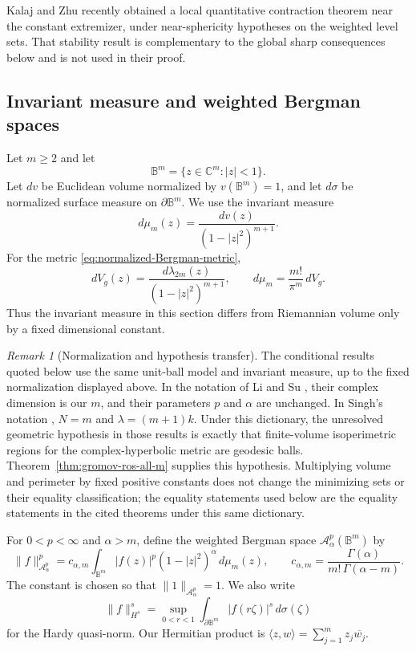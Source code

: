 \documentclass[11pt,reqno]{amsart}
\numberwithin{equation}{section}
\theoremstyle{definition}
\theoremstyle{remark}
\newtheorem{remark}[theorem]{Remark}
\begin{document}
{
Kalaj and Zhu \cite{KalajZhu2026} recently obtained a local quantitative
contraction theorem near the constant extremizer, under near-sphericity
hypotheses on the weighted level sets.  That stability result is
complementary to the global sharp consequences below and is not used in
their proof.
}

\subsection{Invariant measure and weighted Bergman spaces}

Let $m\ge2$ and let
\[
\mathbb B^m=\{z\in\mathbb C^m:|z|<1\}.
\]
Let $dv$ be Euclidean volume normalized by $v(\mathbb B^m)=1$, and let
$d\sigma$ be normalized surface measure on $\partial\mathbb B^m$.  We use
the invariant measure
\begin{equation}
 d\mu_m(z)=\frac{dv(z)}{(1-|z|^2)^{m+1}}.
 \label{eq:invariant-ball-measure}
\end{equation}
For the metric \eqref{eq:normalized-Bergman-metric},
\[
 dV_g(z)=\frac{d\lambda_{2m}(z)}{(1-|z|^2)^{m+1}},
 \qquad
 d\mu_m=\frac{m!}{\pi^m}\,dV_g.
\]
Thus the invariant measure in this section differs from Riemannian volume
only by a fixed dimensional constant.

\begin{remark}[Normalization and hypothesis transfer]
\label{rem:analytic-transfer}
The conditional results quoted below use the same unit-ball model and
invariant measure, up to the fixed normalization displayed above.  In the
notation of Li and Su \cite{LiSu2025}, their complex dimension is our \(m\),
and their parameters \(p\) and \(\alpha\) are unchanged.  In Singh's
notation \cite{Singh2026}, \(N=m\) and \(\lambda=(m+1)k\).  Under this
dictionary, the unresolved geometric hypothesis in those results is exactly
that finite-volume isoperimetric regions for the complex-hyperbolic metric
are geodesic balls.  Theorem~\ref{thm:gromov-ros-all-m} supplies this
hypothesis.  Multiplying volume and perimeter by fixed positive constants
does not change the minimizing sets or their equality classification; the
equality statements used below are the equality statements in the cited
theorems under this same dictionary.
\end{remark}

For $0<p<\infty$ and $\alpha>m$, define the weighted Bergman space
$\mathcal A^p_\alpha(\mathbb B^m)$ by
\begin{equation}
 \|f\|_{\mathcal A^p_\alpha}^{p}
 =c_{\alpha,m}\int_{\mathbb B^m}
 |f(z)|^p(1-|z|^2)^\alpha\,d\mu_m(z),
 \qquad
 c_{\alpha,m}=\frac{\Gamma(\alpha)}{m!\,\Gamma(\alpha-m)}.
 \label{eq:weighted-Bergman-norm}
\end{equation}
The constant is chosen so that $\|1\|_{\mathcal A^p_\alpha}=1$.  We also
write
\[
 \|f\|_{H^s}^{s}
 =\sup_{0<r<1}\int_{\partial\mathbb B^m}|f(r\zeta)|^s\,d\sigma(\zeta)
\]
for the Hardy quasi-norm.  Our Hermitian product is
$\langle z,w\rangle=\sum_{j=1}^m z_j\overline{w_j}$.
\end{document}
